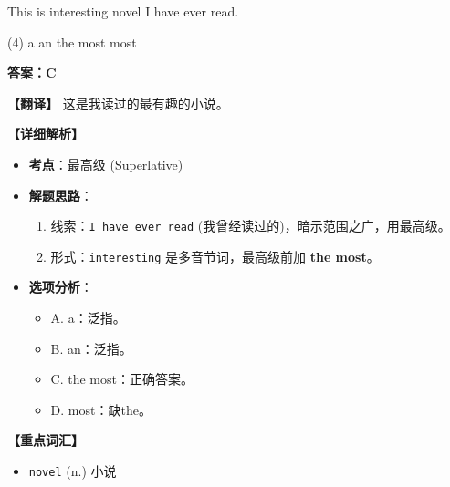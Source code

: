 \documentclass[11pt, a4paper]{article}
\newcommand{\analysis}[4]{
    \begin{solutionbox}
        \textbf{答案：#1}
        
        \textbf{【翻译】} #2
        
        \textbf{【详细解析】}
        #3
        
        \textbf{【重点词汇】}
        #4
    \end{solutionbox}
}
\newcommand{\blank}{\underline{\hspace{1.5cm}}}
\begin{document}
\begin{questions}
    \item This is \blank interesting novel I have ever read.
    \begin{tasks}(4)
        \task a \task an \task the most \task most
    \end{tasks}
    \analysis{C}{这是我读过的最有趣的小说。}{
        \begin{itemize}
            \item \textbf{考点}：最高级 (Superlative)
            \item \textbf{解题思路}：
                \begin{enumerate}
                    \item 线索：\texttt{I have ever read} (我曾经读过的)，暗示范围之广，用最高级。
                    \item 形式：\texttt{interesting} 是多音节词，最高级前加 \textbf{the most}。
                \end{enumerate}
            \item \textbf{选项分析}：
                \begin{itemize}
                    \item A. a：泛指。
                    \item B. an：泛指。
                    \item C. the most：正确答案。
                    \item D. most：缺the。
                \end{itemize}
        \end{itemize}
    }{
        \begin{itemize}
            \item \texttt{novel} (n.) 小说
        \end{itemize}
    }


\end{questions}
\end{document}
